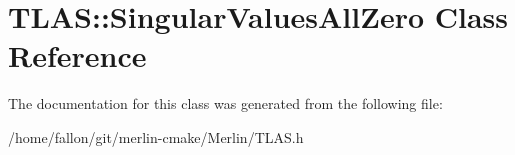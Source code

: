 \hypertarget{classTLAS_1_1SingularValuesAllZero}{}\section{T\+L\+AS\+:\+:Singular\+Values\+All\+Zero Class Reference}
\label{classTLAS_1_1SingularValuesAllZero}


The documentation for this class was generated from the following file\+:\begin{DoxyCompactItemize}
\item 
/home/fallon/git/merlin-\/cmake/\+Merlin/T\+L\+A\+S.\+h\end{DoxyCompactItemize}
